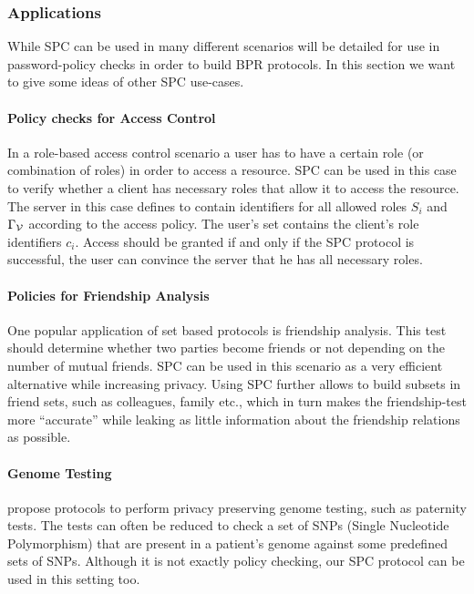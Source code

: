 \subsubsection{Applications}\label{sec:generalisation}
While \ac{SPC} can be used in many different scenarios will be detailed for use in password-policy checks in order to build \ac{BPR} protocols.
In this section we want to give some ideas of other \ac{SPC} use-cases.

\paragraph{Policy checks for Access Control}
In a role-based access control scenario \cite{FerraioloK09} a user has to have a certain role (or combination of roles) in order to access a resource.
\ac{SPC} can be used in this case to verify whether a client has necessary roles that allow it to access the resource.
The server in this case defines \ServerSet to contain identifiers for all allowed roles $S_i$ and $\Gamma_\mathcal{V}$ according to the access policy.
The user's set \ClientSet contains the client's role identifiers $c_i$.
Access should be granted if and only if the \ac{SPC} protocol is successful, \ie the user can convince the server that he has all necessary roles.

\paragraph{Policies for Friendship Analysis}
One popular application of set based protocols is friendship analysis.
This test should determine whether two parties become friends or not depending on the number of mutual friends.
\ac{SPC} can be used in this scenario as a very efficient alternative while increasing privacy.
Using \ac{SPC} further allows to build subsets in friend sets, such as colleagues, family etc., which in turn makes the friendship-test more ``accurate'' while leaking as little information about the friendship relations as possible.

\paragraph{Genome Testing}
\citet{BaldiBCGT11} propose protocols to perform privacy preserving genome testing, such as paternity tests. 
The tests can often be reduced to check a set of SNPs (Single Nucleotide Polymorphism) that are present in a patient's genome against some predefined sets of SNPs. Although it is not exactly policy checking, our \ac{SPC} protocol can be used in this setting too. 


